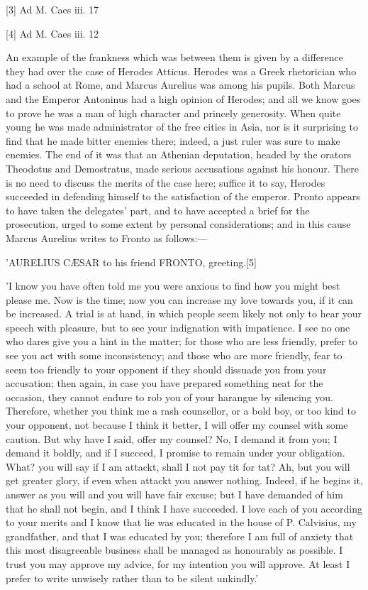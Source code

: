 [3]
Ad M. Caes iii. 17

[4]
Ad M. Caes iii. 12

An example of the frankness which was between them is given by a
difference they had over the case of Herodes Atticus. Herodes was a Greek
rhetorician who had a school at Rome, and Marcus Aurelius was among his
pupils. Both Marcus and the Emperor Antoninus had a high opinion of
Herodes; and all we know goes to prove he was a man of high character and
princely generosity. When quite young he was made administrator of the
free cities in Asia, nor is it surprising to find that he made bitter
enemies there; indeed, a just ruler was sure to make enemies. The end of
it was that an Athenian deputation, headed by the orators Theodotus and
Demostratus, made serious accusations against his honour. There is no need
to discuss the merits of the case here; suffice it to say, Herodes
succeeded in defending himself to the satisfaction of the emperor. Pronto
appears to have taken the delegates' part, and to have accepted a brief
for the prosecution, urged to some extent by personal considerations; and
in this cause Marcus Aurelius writes to Fronto as follows:—

'AURELIUS CÆSAR to his friend FRONTO, greeting.[5]

'I know you have often told me you were anxious to find how you might
best please me. Now is the time; now you can increase my love towards
you, if it can be increased. A trial is at hand, in which people seem
likely not only to hear your speech with pleasure, but to see your
indignation with impatience. I see no one who dares give you a hint in
the matter; for those who are less friendly, prefer to see you act with
some inconsistency; and those who are more friendly, fear to seem too
friendly to your opponent if they should dissuade you from your
accusation; then again, in case you have prepared something neat for the
occasion, they cannot endure to rob you of your harangue by silencing
you. Therefore, whether you think me a rash counsellor, or a bold boy, or
too kind to your opponent, not because I think it better, I will offer my
counsel with some caution. But why have I said, offer my counsel? No, I
demand it from you; I demand it boldly, and if I succeed, I promise to
remain under your obligation. What? you will say if I am attackt, shall I
not pay tit for tat? Ah, but you will get greater glory, if even when
attackt you answer nothing. Indeed, if he begins it, answer as you will
and you will have fair excuse; but I have demanded of him that he shall
not begin, and I think I have succeeded. I love each of you according to
your merits and I know that lie was educated in the house of P.
Calvisius, my grandfather, and that I was educated by you; therefore I am
full of anxiety that this most disagreeable business shall be managed as
honourably as possible. I trust you may approve my advice, for my
intention you will approve. At least I prefer to write unwisely rather
than to be silent unkindly.'

